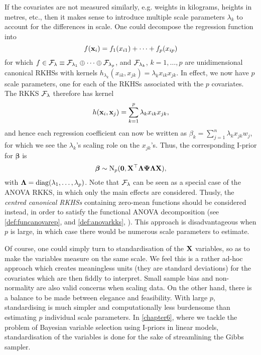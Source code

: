 If the covariates are not measured similarly, e.g. weights in kilograms, heights in metres, etc., then it makes sense to introduce multiple scale parameters $\lambda_k$ to account for the differences in scale.
One could decompose the regression function into
\[
  f({\mathbf x}_i) = f_1(x_{i1}) + \cdots + f_p(x_{ip}) 
\]
for which $f \in {\mathcal F}_\lambda \equiv {\mathcal F}_{\lambda_1}\oplus\cdots\oplus{\mathcal F}_{\lambda_p}$, and ${\mathcal F}_{\lambda_k}$, $k=1,\dots,p$ are unidimensional canonical RKHSs with kernels $h_{\lambda_k}(x_{ik},x_{jk}) = \lambda_k x_{ik} x_{jk}$.
In effect, we now have $p$ scale parameters, one for each of the RKHSs associated with the $p$ covariates.
The RKKS ${\mathcal F}_\lambda$ therefore has kernel
\[
  h({\mathbf x}_i,{\mathbf x}_j) = \sum_{k=1}^p \lambda_k  x_{ik} x_{jk},
\]
and hence each regression coefficient can now be written as $\beta_k =  \sum_{j=1}^n  \lambda_k x_{jk}w_j$, for which we see the $\lambda_k$'s scaling role on the $x_{jk}$'s.
Thus, the corresponding I-prior for $\boldsymbol{\beta}$ is
\[
  \boldsymbol{\beta} \sim \operatorname{N}_p({\mathbf 0}, {\mathbf X}^\top{\bm\Lambda} {\bm\Psi} {\bm\Lambda} {\mathbf X}),
\]
with ${\bm\Lambda} = \operatorname{diag}(\lambda_1,\dots,\lambda_p)$.
Note that ${\mathcal F}_\lambda$ can be seen as a special case of the ANOVA RKKS, in which only the main effects are considered. 
Thusly, the \emph{centred canonical RKHSs} containing zero-mean functions should be considered instead, in order to satisfy the functional ANOVA decomposition (see \cref{def:funcanovarep},  and \cref{def:anovarkks}, ).
This approach is disadvantageous when $p$ is large, in which case there would be numerous scale parameters to estimate.

\begin{remark}
  Of course, one could simply turn to standardisation of the ${\mathbf X}$ variables, so as to make the variables measure on the same scale.
  We feel this is a rather ad-hoc approach which creates meaningless units (they are standard deviations) for the covariates which are then fiddly to interpret.
  Small sample bias and non-normality are also valid concerns when scaling data.
  On the other hand, there is a balance to be made between elegance and feasibility.
  With large $p$, standardising is much simpler and computationally less burdensome than estimating $p$ individual scale parameters.
  In \cref{chapter6}, where we tackle the problem of  Bayesian variable selection using I-priors in linear models, standardisation of the variables is done for the sake of streamlining the Gibbs sampler.
\end{remark}


